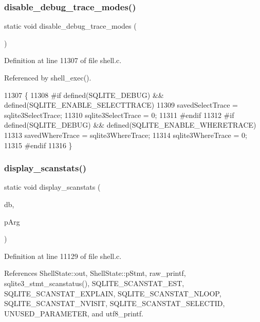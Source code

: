 \subsubsection{disable\+\_\+debug\+\_\+trace\+\_\+modes()}
{\footnotesize\ttfamily static void disable\+\_\+debug\+\_\+trace\+\_\+modes (\begin{DoxyParamCaption}\item[{void}]{ }\end{DoxyParamCaption})\hspace{0.3cm}{\ttfamily [static]}}



Definition at line 11307 of file shell.\+c.



Referenced by shell\+\_\+exec().


\begin{DoxyCode}
11307                                            \{
11308 \textcolor{preprocessor}{#if defined(SQLITE\_DEBUG) && defined(SQLITE\_ENABLE\_SELECTTRACE)}
11309   savedSelectTrace = sqlite3SelectTrace;
11310   sqlite3SelectTrace = 0;
11311 \textcolor{preprocessor}{#endif}
11312 \textcolor{preprocessor}{#if defined(SQLITE\_DEBUG) && defined(SQLITE\_ENABLE\_WHERETRACE)}
11313   savedWhereTrace = sqlite3WhereTrace;
11314   sqlite3WhereTrace = 0;
11315 \textcolor{preprocessor}{#endif}
11316 \}
\end{DoxyCode}
\mbox{\label{shell_8c_a3249bf38864ddd9a6b526fc1f4a500b1}} 
\subsubsection{display\+\_\+scanstats()}
{\footnotesize\ttfamily static void display\+\_\+scanstats (\begin{DoxyParamCaption}\item[{\textbf{ sqlite3} $\ast$}]{db,  }\item[{\textbf{ Shell\+State} $\ast$}]{p\+Arg }\end{DoxyParamCaption})\hspace{0.3cm}{\ttfamily [static]}}



Definition at line 11129 of file shell.\+c.



References Shell\+State\+::out, Shell\+State\+::p\+Stmt, raw\+\_\+printf, sqlite3\+\_\+stmt\+\_\+scanstatus(), S\+Q\+L\+I\+T\+E\+\_\+\+S\+C\+A\+N\+S\+T\+A\+T\+\_\+\+E\+ST, S\+Q\+L\+I\+T\+E\+\_\+\+S\+C\+A\+N\+S\+T\+A\+T\+\_\+\+E\+X\+P\+L\+A\+IN, S\+Q\+L\+I\+T\+E\+\_\+\+S\+C\+A\+N\+S\+T\+A\+T\+\_\+\+N\+L\+O\+OP, S\+Q\+L\+I\+T\+E\+\_\+\+S\+C\+A\+N\+S\+T\+A\+T\+\_\+\+N\+V\+I\+S\+IT, S\+Q\+L\+I\+T\+E\+\_\+\+S\+C\+A\+N\+S\+T\+A\+T\+\_\+\+S\+E\+L\+E\+C\+T\+ID, U\+N\+U\+S\+E\+D\+\_\+\+P\+A\+R\+A\+M\+E\+T\+ER, and utf8\+\_\+printf.




